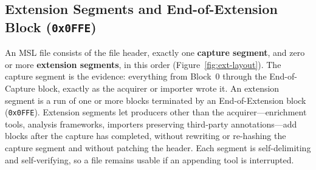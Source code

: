 \documentclass[11pt,a4paper]{article}
\newcommand{\hex}[1]{\texttt{0x#1}}
\begin{document}
\subsection{Extension Segments and End-of-Extension Block (\hex{0FFE})}\label{sec:extsegments}
An MSL file consists of the file header, exactly one \textbf{capture segment}, and zero or more \textbf{extension segments}, in this order (Figure~\ref{fig:ext-layout}). The capture segment is the evidence: everything from Block~0 through the End-of-Capture block, exactly as the acquirer or importer wrote it. An extension segment is a run of one or more blocks terminated by an End-of-Extension block (\hex{0FFE}). Extension segments let producers other than the acquirer---enrichment tools, analysis frameworks, importers preserving third-party annotations---add blocks after the capture has completed, without rewriting or re-hashing the capture segment and without patching the header. Each segment is self-delimiting and self-verifying, so a file remains usable if an appending tool is interrupted.
\end{document}
